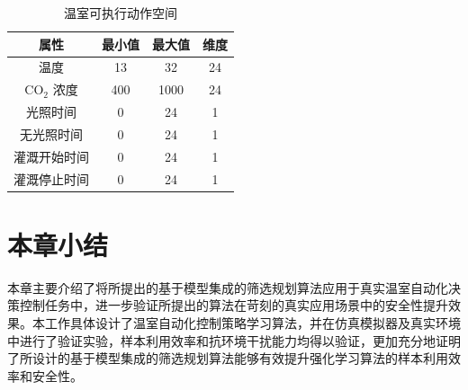 \begin{table}[htbp]
\centering
\begin{tabular}{cccc}
\toprule
\textbf{属性}                                     & \textbf{最小值} & \textbf{最大值} & \textbf{维度} \\
\midrule
温度          & 13           & 32           & 24           \\
CO$_2$ 浓度               & 400          & 1000         & 24           \\
光照时间                 & 0            & 24           & 1            \\
无光照时间                & 0            & 24           & 1            \\
灌溉开始时间         & 0            & 24           & 1            \\
灌溉停止时间          & 0            & 24           & 1            \\
\bottomrule
\end{tabular}
\caption{温室可执行动作空间}
\label{tab:act-space}
\end{table}

\section{本章小结}

本章主要介绍了将所提出的基于模型集成的筛选规划算法应用于真实温室自动化决策控制任务中，进一步验证所提出的算法在苛刻的真实应用场景中的安全性提升效果。本工作具体设计了温室自动化控制策略学习算法，并在仿真模拟器及真实环境中进行了验证实验，样本利用效率和抗环境干扰能力均得以验证，更加充分地证明了所设计的基于模型集成的筛选规划算法能够有效提升强化学习算法的样本利用效率和安全性。
